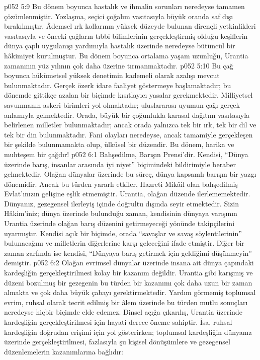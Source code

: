 \vs p052 5:9 Bu dönem boyunca hastalık ve ihmalin sorunları neredeyse tamamen çözümlenmiştir. Yozlaşma, seçici çoğalım vasıtasıyla büyük oranda saf dışı bırakılmıştır. Âdemsel ırk kollarının yüksek düzeyde bulunan dirençli yetkinlikleri vasıtasıyla ve önceki çağların tıbbi bilimlerinin gerçekleştirmiş olduğu keşiflerin dünya çaplı uygulanışı yardımıyla hastalık üzerinde neredeyse bütüncül bir hâkimiyet kurulmuştur. Bu dönem boyunca ortalama yaşam uzunluğu, Urantia zamanının yüz yılının çok daha üzerine tırmanmaktadır.
\vs p052 5:10 Bu çağ boyunca hükümetsel yüksek denetimin kademeli olarak azalışı mevcut bulunmaktadır. Gerçek özerk idare faaliyet göstermeye başlamaktadır; bu dönemde gittikçe azalan bir biçimde kısıtlayıcı yasalar gerekmektedir. Milliyetsel savunmanın askeri birimleri yol olmaktadır; uluslararası uyumun çağı gerçek anlamıyla gelmektedir. Orada, büyük bir çoğunlukla karasal dağıtım vasıtasıyla belirlenen milletler bulunmaktadır; ancak orada yalnızca tek bir ırk, tek bir dil ve tek bir din bulunmaktadır. Fani olayları neredeyse, ancak tamamiyle gerçekleşen bir şekilde bulunmamakta olup, ülküsel bir düzendir. Bu dönem, harika ve muhteşem bir çağdır!
\vs p052 6:1 Bahşedilme, Barışın Prensi’dir. Kendisi, “Dünya üzerinde barış, insanlar arasında iyi niyet” biçimindeki bildirimiyle beraber gelmektedir. Olağan dünyalar üzerinde bu süreç, dünya kapsamlı barışın bir yazgı dönemidir. Ancak bu türden yararlı etkiler, Hazreti Mikâil olan bahşedilmiş Evlat’ınızın gelişine eşlik etmemiştir. Urantia, olağan düzende ilerlememektedir. Dünyanız, gezegensel ilerleyiş içinde doğrultu dışında seyir etmektedir. Sizin Hâkim’iniz; dünya üzerinde bulunduğu zaman, kendisinin dünyaya varışının Urantia üzerinde olağan barış düzenini getirmeyeceği yönünde takipçilerini uyarmıştır. Kendisi açık bir biçimde, orada “savaşlar ve savaş söylentilerinin” bulunacağını ve milletlerin diğerlerine karşı geleceğini ifade etmiştir. Diğer bir zaman zarfında ise kendisi, “Dünyaya barış getirmek için geldiğimi düşünmeyin” demiştir.
\vs p052 6:2 Olağan evrimsel dünyalar üzerinde insana ait dünya çapındaki kardeşliğin gerçekleştirilmesi kolay bir kazanım değildir. Urantia gibi karışmış ve düzeni bozulmuş bir gezegenin bu türden bir kazanımı çok daha uzun bir zaman almakta ve çok daha büyük çabayı gerektirmektedir. Yardım görmemiş toplumsal evrim, ruhsal olarak tecrit edilmiş bir âlem üzerinde bu türden mutlu sonuçları neredeyse hiçbir biçimde elde edemez. Dinsel açığa çıkarılış, Urantia üzerinde kardeşliğin gerçekleştirilmesi için hayati derece öneme sahiptir. İsa, ruhsal kardeşliğin doğrudan erişimi için yol gösterirken; toplumsal kardeşliğin dünyanız üzerinde gerçekleştirilmesi, fazlasıyla şu kişisel dönüşümlere ve gezegensel düzenlemelerin kazanımlarına bağlıdır:
